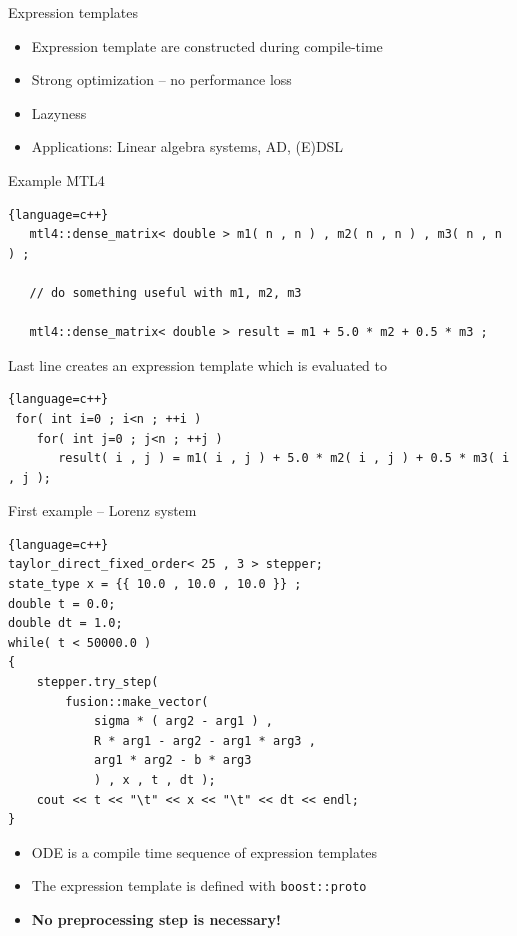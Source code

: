 \documentclass{beamer}
\begin{document}
\begin{frame}[fragile]{Expression templates}

\begin{itemize}
  \item Expression template are constructed during compile-time
  \item Strong optimization -- no performance loss
  \item Lazyness
  \item Applications: Linear algebra systems, AD, (E)DSL
\end{itemize}

\vspace{2ex}
Example MTL4
 \begin{lstlisting}{language=c++}
   mtl4::dense_matrix< double > m1( n , n ) , m2( n , n ) , m3( n , n ) ;
   
   // do something useful with m1, m2, m3
   
   mtl4::dense_matrix< double > result = m1 + 5.0 * m2 + 0.5 * m3 ;
 \end{lstlisting}

\vspace{2ex}
Last line creates an expression template which is evaluated to
\begin{lstlisting}{language=c++}
 for( int i=0 ; i<n ; ++i )
    for( int j=0 ; j<n ; ++j )
       result( i , j ) = m1( i , j ) + 5.0 * m2( i , j ) + 0.5 * m3( i , j );
\end{lstlisting}

\end{frame}








\begin{frame}[fragile]{First example -- Lorenz system}

\begin{lstlisting}{language=c++}
taylor_direct_fixed_order< 25 , 3 > stepper;
state_type x = {{ 10.0 , 10.0 , 10.0 }} ;
double t = 0.0;
double dt = 1.0;
while( t < 50000.0 )
{
    stepper.try_step(
        fusion::make_vector(
            sigma * ( arg2 - arg1 ) ,
            R * arg1 - arg2 - arg1 * arg3 ,
            arg1 * arg2 - b * arg3
            ) , x , t , dt );
    cout << t << "\t" << x << "\t" << dt << endl;
}
\end{lstlisting}

\begin{itemize}
 \item ODE is a compile time sequence of expression templates
 \item The expression template is defined with {\tt boost::proto}
 \item {\bf No preprocessing step is necessary!}
\end{itemize}


\end{frame}
\end{document}

